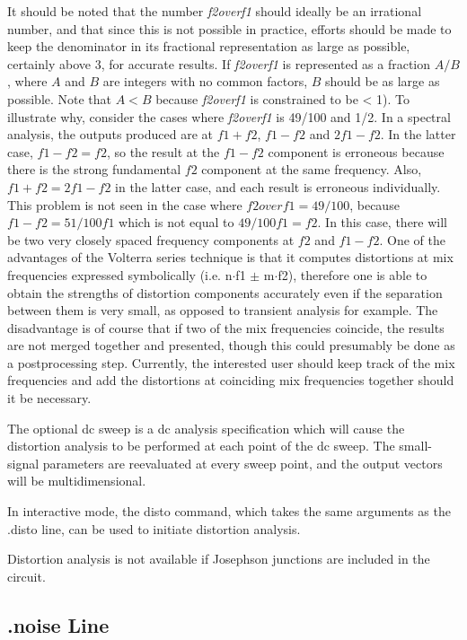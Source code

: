 It should be noted that the number {\it f2overf1\/} should ideally be
an irrational number, and that since this is not possible in practice,
efforts should be made to keep the denominator in its fractional
representation as large as possible, certainly above 3, for accurate
results.  If {\it f2overf1\/} is represented as a fraction $A/B$,
where $A$ and $B$ are integers with no common factors, $B$ should be
as large as possible.  Note that $A < B$ because {\it f2overf1\/} is
constrained to be {\vt <} 1).  To illustrate why, consider the cases
where {\it f2overf1\/} is 49/100 and 1/2.  In a spectral analysis, the
outputs produced are at $f1+f2$, $f1-f2$ and $2f1-f2$.  In the latter
case, $f1-f2 = f2$, so the result at the $f1-f2$ component is
erroneous because there is the strong fundamental $f2$ component at
the same frequency.  Also, $f1+f2 = 2f1-f2$ in the latter case, and
each result is erroneous individually.  This problem is not seen in
the case where $f2overf1 = 49/100$, because $f1-f2 = 51/100 f1$ which
is not equal to $49/100 f1 = f2$.  In this case, there will be two
very closely spaced frequency components at $f2$ and $f1-f2$.  One of
the advantages of the Volterra series technique is that it computes
distortions at mix frequencies expressed symbolically (i.e. 
n$\cdot$f1 $\pm$ m$\cdot$f2), therefore one is able to obtain the
strengths of distortion components accurately even if the separation
between them is very small, as opposed to transient analysis for
example.  The disadvantage is of course that if two of the mix
frequencies coincide, the results are not merged together and
presented, though this could presumably be done as a postprocessing
step.  Currently, the interested user should keep track of the mix
frequencies and add the distortions at coinciding
mix frequencies together should it be necessary.

The optional dc sweep is a dc analysis specification which will cause
the distortion analysis to be performed at each point of the dc sweep. 
The small-signal parameters are reevaluated at every sweep point, and
the output vectors will be multidimensional.

In interactive mode, the {\cb disto} command, which takes the same
arguments as the {\vt .disto} line, can be used to initiate distortion
analysis.

Distortion analysis is not available if Josephson junctions are
included in the circuit.

\subsection{{\vt .noise} Line}
\label{noiseline}

